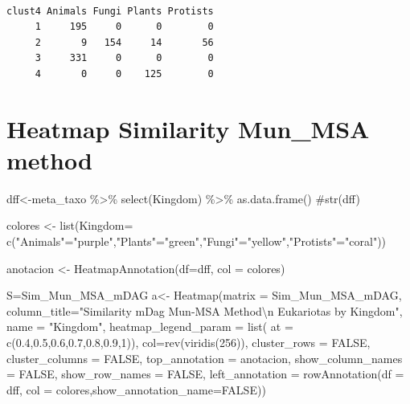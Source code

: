 \documentclass[
  letterpaper,
  DIV=11,
  numbers=noendperiod]{scrreprt}
\newenvironment{Shaded}{\begin{snugshade}}{\end{snugshade}}
\newcommand{\AttributeTok}[1]{\textcolor[rgb]{0.40,0.45,0.13}{#1}}
\newcommand{\CommentTok}[1]{\textcolor[rgb]{0.37,0.37,0.37}{#1}}
\newcommand{\ConstantTok}[1]{\textcolor[rgb]{0.56,0.35,0.01}{#1}}
\newcommand{\DecValTok}[1]{\textcolor[rgb]{0.68,0.00,0.00}{#1}}
\newcommand{\FloatTok}[1]{\textcolor[rgb]{0.68,0.00,0.00}{#1}}
\newcommand{\FunctionTok}[1]{\textcolor[rgb]{0.28,0.35,0.67}{#1}}
\newcommand{\NormalTok}[1]{\textcolor[rgb]{0.00,0.23,0.31}{#1}}
\newcommand{\OtherTok}[1]{\textcolor[rgb]{0.00,0.23,0.31}{#1}}
\newcommand{\SpecialCharTok}[1]{\textcolor[rgb]{0.37,0.37,0.37}{#1}}
\newcommand{\StringTok}[1]{\textcolor[rgb]{0.13,0.47,0.30}{#1}}
\begin{document}
\begin{verbatim}
      
clust4 Animals Fungi Plants Protists
     1     195     0      0        0
     2       9   154     14       56
     3     331     0      0        0
     4       0     0    125        0
\end{verbatim}

\hypertarget{heatmap-similarity-mun_msa-method}{%
\section{Heatmap Similarity Mun\_MSA
method}\label{heatmap-similarity-mun_msa-method}}

\begin{Shaded}
\begin{Highlighting}[]
\NormalTok{dff}\OtherTok{\textless{}{-}}\NormalTok{meta\_taxo }\SpecialCharTok{\%\textgreater{}\%} \FunctionTok{select}\NormalTok{(Kingdom)  }\SpecialCharTok{\%\textgreater{}\%} \FunctionTok{as.data.frame}\NormalTok{()}
\CommentTok{\#str(dff)}

\NormalTok{colores }\OtherTok{\textless{}{-}} \FunctionTok{list}\NormalTok{(}\AttributeTok{Kingdom=} \FunctionTok{c}\NormalTok{(}\StringTok{"Animals"}\OtherTok{=}\StringTok{"purple"}\NormalTok{,}\StringTok{"Plants"}\OtherTok{=}\StringTok{"green"}\NormalTok{,}\StringTok{"Fungi"}\OtherTok{=}\StringTok{"yellow"}\NormalTok{,}\StringTok{"Protists"}\OtherTok{=}\StringTok{"coral"}\NormalTok{))}

\NormalTok{anotacion }\OtherTok{\textless{}{-}} \FunctionTok{HeatmapAnnotation}\NormalTok{(}\AttributeTok{df=}\NormalTok{dff, }\AttributeTok{col =}\NormalTok{ colores)}

\NormalTok{S}\OtherTok{=}\NormalTok{Sim\_Mun\_MSA\_mDAG}
\NormalTok{a}\OtherTok{\textless{}{-}} \FunctionTok{Heatmap}\NormalTok{(}\AttributeTok{matrix =}\NormalTok{ Sim\_Mun\_MSA\_mDAG, }
                          \AttributeTok{column\_title=}\StringTok{"Similarity mDag Mun{-}MSA Method}\SpecialCharTok{\textbackslash{}n}\StringTok{  Eukariotas by Kingdom"}\NormalTok{,}
            \AttributeTok{name =} \StringTok{"Kingdom"}\NormalTok{,}
            \AttributeTok{heatmap\_legend\_param =} \FunctionTok{list}\NormalTok{(}
    \AttributeTok{at =} \FunctionTok{c}\NormalTok{(}\FloatTok{0.4}\NormalTok{,}\FloatTok{0.5}\NormalTok{,}\FloatTok{0.6}\NormalTok{,}\FloatTok{0.7}\NormalTok{,}\FloatTok{0.8}\NormalTok{,}\FloatTok{0.9}\NormalTok{,}\DecValTok{1}\NormalTok{)),}
        \AttributeTok{col=}\FunctionTok{rev}\NormalTok{(}\FunctionTok{viridis}\NormalTok{(}\DecValTok{256}\NormalTok{)),}
        \AttributeTok{cluster\_rows =} \ConstantTok{FALSE}\NormalTok{,}
        \AttributeTok{cluster\_columns =} \ConstantTok{FALSE}\NormalTok{,}
        \AttributeTok{top\_annotation =}\NormalTok{ anotacion,}
        \AttributeTok{show\_column\_names =} \ConstantTok{FALSE}\NormalTok{, }
        \AttributeTok{show\_row\_names =} \ConstantTok{FALSE}\NormalTok{,}
        \AttributeTok{left\_annotation =} \FunctionTok{rowAnnotation}\NormalTok{(}\AttributeTok{df =}\NormalTok{ dff, }\AttributeTok{col =}\NormalTok{ colores,}\AttributeTok{show\_annotation\_name=}\ConstantTok{FALSE}\NormalTok{))}
  

\end{Highlighting}
\end{Shaded}
\end{document}
